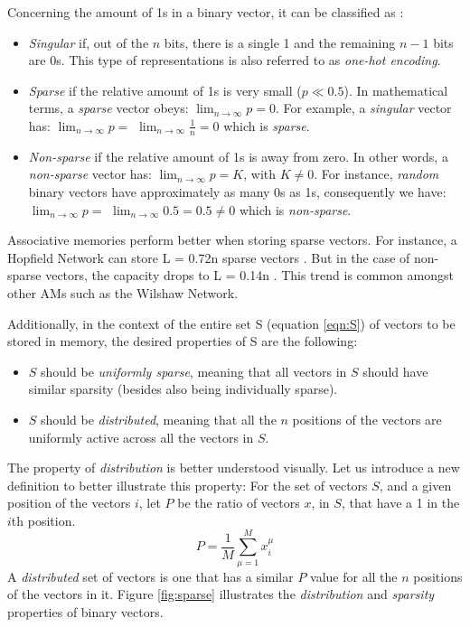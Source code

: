 \documentclass[runningheads]{llncs}
\begin{document}
Concerning the amount of 1s in a binary vector, it can be classified as \cite{palm1996associative}:
\begin{itemize}
    \item \textit{Singular} if, out of the $n$ bits, there is a single 1 and the remaining $n-1$ bits are 0s. This type of representations is also referred to as \textit{one-hot encoding}.
    \item \textit{Sparse} if the relative amount of 1s is very small ($p\ll0.5$). In mathematical terms, a\textit{ sparse }vector obeys: $\lim _{n \rightarrow \infty} p=0$. For example, a \textit{singular} vector has: $\lim _{n \rightarrow \infty} p = $ $ \lim _{n \rightarrow \infty} \frac{1}{n} = 0$ which is \textit{sparse}.
    \item \textit{Non-sparse} if the relative amount of 1s is away from zero. In other words, a \textit{non-sparse} vector has: $\lim _{n \rightarrow \infty} p=K$, with $K \neq 0$. For instance, \textit{random} binary vectors have approximately as many 0s as 1s, consequently we have: $\lim _{n \rightarrow \infty} p = $ $ \lim _{n \rightarrow \infty} 0.5 = 0.5 \neq 0$ which is \textit{non-sparse}.
\end{itemize}
Associative memories perform better when storing sparse vectors. For instance, a Hopfield Network can store L = 0.72n sparse vectors \cite{gardner1988space}. But in the case of non-sparse vectors, the capacity drops to L = 0.14n \cite{hopfield1982neural}. This trend is common amongst other AMs such as the Wilshaw Network.
\newline

Additionally, in the context of the entire set S (equation \ref{eqn:S}) of vectors to be stored in memory, the desired properties of S are the following:
\begin{itemize}
    \item $S$ should be \textit{uniformly sparse}, meaning that all vectors in $S$ should have similar sparsity (besides also being individually sparse).
    \item $S$ should be \textit{distributed}, meaning that all the $n$ positions of the vectors are uniformly active across all the vectors in $S$.
\end{itemize}

The property of \textit{distribution} is better understood visually. Let us introduce a new definition to better illustrate this property:
\newline
For the set of vectors $S$, and a given position of the vectors $i$, let $P$ be the ratio of vectors $x$, in $S$, that have a 1 in the $i$th position.
\begin{equation}
\label{eqn:P}
    P = \frac{1}{M}\sum_{\mu=1}^{M}x^{\mu}_i
\end{equation}
A \textit{distributed} set of vectors is one that has a similar $P$ value for all the $n$ positions of the vectors in it. Figure \ref{fig:sparse} illustrates the \textit{distribution} and \textit{sparsity} properties of binary vectors.
\end{document}

